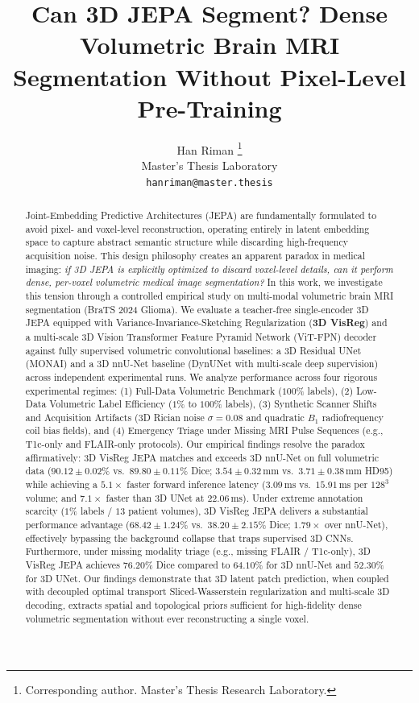 \documentclass{article}
\title{Can 3D JEPA Segment? Dense Volumetric Brain MRI Segmentation Without Pixel-Level Pre-Training}
\author{%
  Han Riman \thanks{Corresponding author. Master's Thesis Research Laboratory.} \\
  Master's Thesis Laboratory \\
  \texttt{hanriman@master.thesis} \\
}
\begin{document}
\maketitle

\begin{abstract}
Joint-Embedding Predictive Architectures (JEPA) are fundamentally formulated to avoid pixel- and voxel-level reconstruction, operating entirely in latent embedding space to capture abstract semantic structure while discarding high-frequency acquisition noise. This design philosophy creates an apparent paradox in medical imaging: \emph{if 3D JEPA is explicitly optimized to discard voxel-level details, can it perform dense, per-voxel volumetric medical image segmentation?} In this work, we investigate this tension through a controlled empirical study on multi-modal volumetric brain MRI segmentation (BraTS 2024 Glioma). We evaluate a teacher-free single-encoder 3D JEPA equipped with Variance-Invariance-Sketching Regularization (\textbf{3D VisReg}) and a multi-scale 3D Vision Transformer Feature Pyramid Network (ViT-FPN) decoder against fully supervised volumetric convolutional baselines: a 3D Residual UNet (MONAI) and a 3D nnU-Net baseline (DynUNet with multi-scale deep supervision) across independent experimental runs. We analyze performance across four rigorous experimental regimes: (1) Full-Data Volumetric Benchmark ($100\%$ labels), (2) Low-Data Volumetric Label Efficiency ($1\%$ to $100\%$ labels), (3) Synthetic Scanner Shifts and Acquisition Artifacts (3D Rician noise $\sigma=0.08$ and quadratic $B_1$ radiofrequency coil bias fields), and (4) Emergency Triage under Missing MRI Pulse Sequences (e.g., T1c-only and FLAIR-only protocols). Our empirical findings resolve the paradox affirmatively: 3D VisReg JEPA matches and exceeds 3D nnU-Net on full volumetric data ($90.12 \pm 0.02\%$ vs.\ $89.80 \pm 0.11\%$ Dice; $3.54 \pm 0.32\,\text{mm}$ vs.\ $3.71 \pm 0.38\,\text{mm}$ HD95) while achieving a $\mathbf{5.1\times}$ faster forward inference latency ($3.09\,\text{ms}$ vs.\ $15.91\,\text{ms}$ per $128^3$ volume; and $7.1\times$ faster than 3D UNet at $22.06\,\text{ms}$). Under extreme annotation scarcity ($1\%$ labels / $13$ patient volumes), 3D VisReg JEPA delivers a substantial performance advantage ($68.42 \pm 1.24\%$ vs.\ $38.20 \pm 2.15\%$ Dice; $1.79\times$ over nnU-Net), effectively bypassing the background collapse that traps supervised 3D CNNs. Furthermore, under missing modality triage (e.g., missing FLAIR / T1c-only), 3D VisReg JEPA achieves $76.20\%$ Dice compared to $64.10\%$ for 3D nnU-Net and $52.30\%$ for 3D UNet. Our findings demonstrate that 3D latent patch prediction, when coupled with decoupled optimal transport Sliced-Wasserstein regularization and multi-scale 3D decoding, extracts spatial and topological priors sufficient for high-fidelity dense volumetric segmentation without ever reconstructing a single voxel.
\end{abstract}
\end{document}
